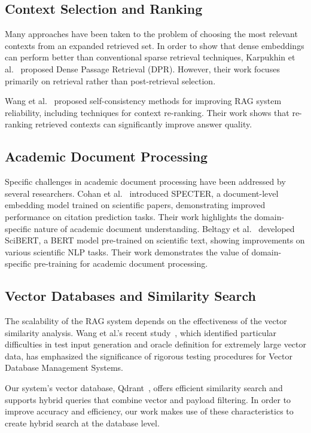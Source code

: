 \documentclass[runningheads]{llncs}
\begin{document}
\subsection{Context Selection and Ranking}

Many approaches have been taken to the problem of choosing the most relevant contexts from an expanded retrieved set. In order to show that dense embeddings can perform better than conventional sparse retrieval techniques, Karpukhin et al.~\cite{karpukhin2020dense} proposed Dense Passage Retrieval (DPR). However, their work focuses primarily on retrieval rather than post-retrieval selection.

Wang et al.~\cite{wang2023self} proposed self-consistency methods for improving RAG system reliability, including techniques for context re-ranking. Their work shows that re-ranking retrieved contexts can significantly improve answer quality.

\subsection{Academic Document Processing}

Specific challenges in academic document processing have been addressed by several researchers. Cohan et al.~\cite{cohan2020specter} introduced SPECTER, a document-level embedding model trained on scientific papers, demonstrating improved performance on citation prediction tasks. Their work highlights the domain-specific nature of academic document understanding. Beltagy et al.~\cite{beltagy2019scibert} developed SciBERT, a BERT model pre-trained on scientific text, showing improvements on various scientific NLP tasks. Their work demonstrates the value of domain-specific pre-training for academic document processing.

\subsection{Vector Databases and Similarity Search}

The scalability of the RAG system depends on the effectiveness of the vector similarity analysis. Wang et al.'s recent study~\cite{wang2025vectordb}, which identified particular difficulties in test input generation and oracle definition for extremely large vector data, has emphasized the significance of rigorous testing procedures for Vector Database Management Systems.

Our system's vector database, Qdrant~\cite{qdrant2023}, offers efficient similarity search and supports hybrid queries that combine vector and payload filtering. In order to improve accuracy and efficiency, our work makes use of these characteristics to create hybrid search at the database level.
\end{document}
